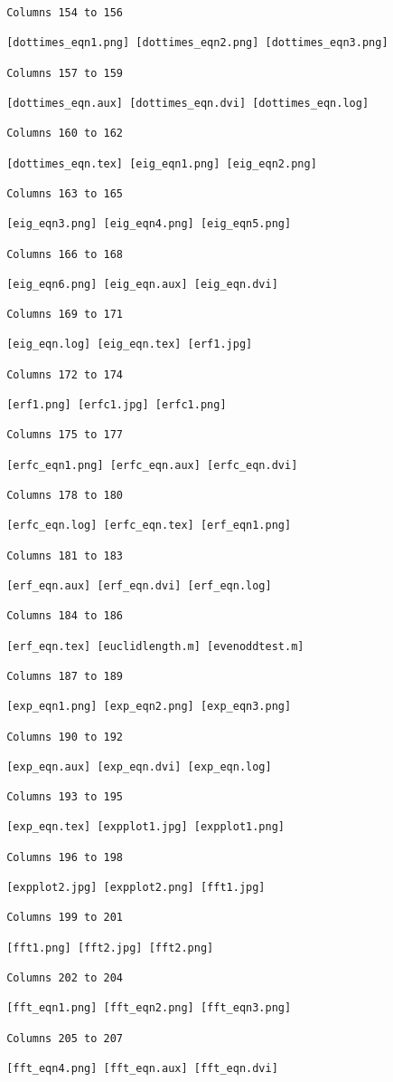 \begin{verbatim}
 Columns 154 to 156

 [dottimes_eqn1.png] [dottimes_eqn2.png] [dottimes_eqn3.png] 

 Columns 157 to 159

 [dottimes_eqn.aux] [dottimes_eqn.dvi] [dottimes_eqn.log] 

 Columns 160 to 162

 [dottimes_eqn.tex] [eig_eqn1.png] [eig_eqn2.png] 

 Columns 163 to 165

 [eig_eqn3.png] [eig_eqn4.png] [eig_eqn5.png] 

 Columns 166 to 168

 [eig_eqn6.png] [eig_eqn.aux] [eig_eqn.dvi] 

 Columns 169 to 171

 [eig_eqn.log] [eig_eqn.tex] [erf1.jpg] 

 Columns 172 to 174

 [erf1.png] [erfc1.jpg] [erfc1.png] 

 Columns 175 to 177

 [erfc_eqn1.png] [erfc_eqn.aux] [erfc_eqn.dvi] 

 Columns 178 to 180

 [erfc_eqn.log] [erfc_eqn.tex] [erf_eqn1.png] 

 Columns 181 to 183

 [erf_eqn.aux] [erf_eqn.dvi] [erf_eqn.log] 

 Columns 184 to 186

 [erf_eqn.tex] [euclidlength.m] [evenoddtest.m] 

 Columns 187 to 189

 [exp_eqn1.png] [exp_eqn2.png] [exp_eqn3.png] 

 Columns 190 to 192

 [exp_eqn.aux] [exp_eqn.dvi] [exp_eqn.log] 

 Columns 193 to 195

 [exp_eqn.tex] [expplot1.jpg] [expplot1.png] 

 Columns 196 to 198

 [expplot2.jpg] [expplot2.png] [fft1.jpg] 

 Columns 199 to 201

 [fft1.png] [fft2.jpg] [fft2.png] 

 Columns 202 to 204

 [fft_eqn1.png] [fft_eqn2.png] [fft_eqn3.png] 

 Columns 205 to 207

 [fft_eqn4.png] [fft_eqn.aux] [fft_eqn.dvi] 


\end{verbatim}
